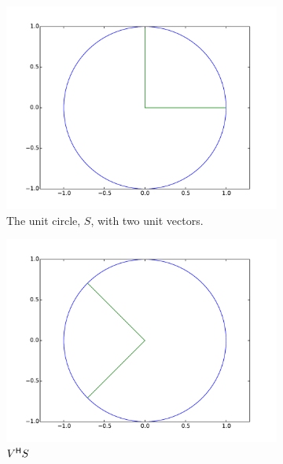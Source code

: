 \begin{figure}
\centering
\begin{subfigure}[b]{.49\textwidth}
  \centering
  \includegraphics[width=\textwidth]{unit_circle.pdf}
  \caption{The unit circle, $S$, with two unit vectors.}
\end{subfigure}
\begin{subfigure}[b]{.49\textwidth}
  \centering
  \includegraphics[width=\textwidth]{vcircle.pdf}
  \caption{$V^{\mathsf H} S$}
\end{subfigure}
\begin{subfigure}[b]{.49\textwidth}
  \centering

\end{subfigure}
\end{figure}
